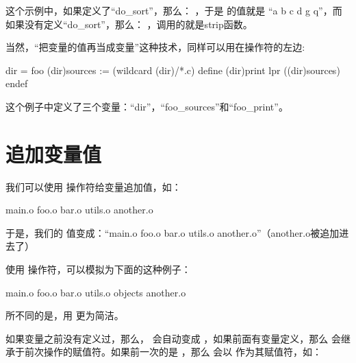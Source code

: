 \documentclass[a4paper,10pt]{sphinxmanual}
\begin{document}
这个示例中，如果定义了“do\_sort”，那么：  ，于是
 的值就是 “a b c d g q”，而如果没有定义“do\_sort”，那么：
 ，调用的就是strip函数。

当然，“把变量的值再当成变量”这种技术，同样可以用在操作符的左边:

\begin{sphinxVerbatim}[commandchars=\\\{\}]
dir = foo
\PYGZdl{}(dir)\PYGZus{}sources := \PYGZdl{}(wildcard \PYGZdl{}(dir)/*.c)
define \PYGZdl{}(dir)\PYGZus{}print
lpr \PYGZdl{}(\PYGZdl{}(dir)\PYGZus{}sources)
endef
\end{sphinxVerbatim}

这个例子中定义了三个变量：“dir”，“foo\_sources”和“foo\_print”。


\section{追加变量值}
\label{\detokenize{variables:id5}}
我们可以使用 \sphinxcode{\sphinxupquote{+=}} 操作符给变量追加值，如：

\begin{sphinxVerbatim}[commandchars=\\\{\}]
  main.o foo.o bar.o utils.o
  another.o
\end{sphinxVerbatim}

于是，我们的  值变成：“main.o foo.o bar.o utils.o another.o”（another.o被追加进去了）

使用 \sphinxcode{\sphinxupquote{+=}} 操作符，可以模拟为下面的这种例子：

\begin{sphinxVerbatim}[commandchars=\\\{\}]
  main.o foo.o bar.o utils.o
  objects another.o
\end{sphinxVerbatim}

所不同的是，用 \sphinxcode{\sphinxupquote{+=}} 更为简洁。

如果变量之前没有定义过，那么， \sphinxcode{\sphinxupquote{+=}} 会自动变成 \sphinxcode{\sphinxupquote{=}} ，如果前面有变量定义，那么 \sphinxcode{\sphinxupquote{+=}} 会继承于前次操作的赋值符。如果前一次的是 \sphinxcode{\sphinxupquote{:=}} ，那么 \sphinxcode{\sphinxupquote{+=}} 会以 \sphinxcode{\sphinxupquote{:=}} 作为其赋值符，如：
\end{document}
